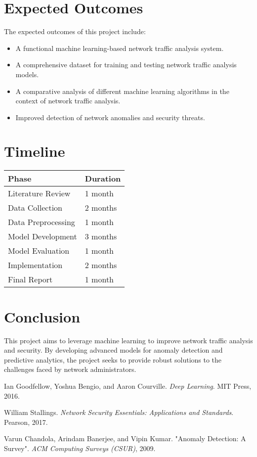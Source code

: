 \documentclass[12pt]{article}
\begin{document}
\section{Expected Outcomes}
The expected outcomes of this project include:
\begin{itemize}
    \item A functional machine learning-based network traffic analysis system.
    \item A comprehensive dataset for training and testing network traffic analysis models.
    \item A comparative analysis of different machine learning algorithms in the context of network traffic analysis.
    \item Improved detection of network anomalies and security threats.
\end{itemize}

\section{Timeline}
\begin{tabular}{|l|l|}
\hline
\textbf{Phase} & \textbf{Duration} \\ \hline
Literature Review & 1 month \\ \hline
Data Collection & 2 months \\ \hline
Data Preprocessing & 1 month \\ \hline
Model Development & 3 months \\ \hline
Model Evaluation & 1 month \\ \hline
Implementation & 2 months \\ \hline
Final Report & 1 month \\ \hline
\end{tabular}

\section{Conclusion}
This project aims to leverage machine learning to improve network traffic analysis and security. By developing advanced models for anomaly detection and predictive analytics, the project seeks to provide robust solutions to the challenges faced by network administrators.

\begin{thebibliography}{9}
Ian Goodfellow, Yoshua Bengio, and Aaron Courville. \textit{Deep Learning}. MIT Press, 2016.

William Stallings. \textit{Network Security Essentials: Applications and Standards}. Pearson, 2017.

Varun Chandola, Arindam Banerjee, and Vipin Kumar. "Anomaly Detection: A Survey". \textit{ACM Computing Surveys (CSUR)}, 2009.
\end{thebibliography}
\end{document}
